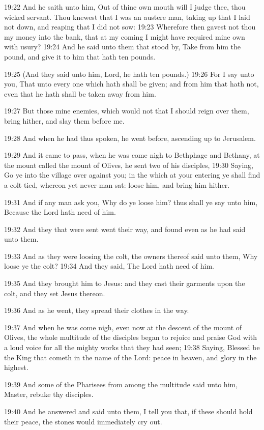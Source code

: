19:22 And he saith unto him, Out of thine own mouth will I judge thee,
thou wicked servant. Thou knewest that I was an austere man, taking up
that I laid not down, and reaping that I did not sow: 19:23 Wherefore
then gavest not thou my money into the bank, that at my coming I might
have required mine own with usury?  19:24 And he said unto them that
stood by, Take from him the pound, and give it to him that hath ten
pounds.

19:25 (And they said unto him, Lord, he hath ten pounds.)  19:26 For I
say unto you, That unto every one which hath shall be given; and from
him that hath not, even that he hath shall be taken away from him.

19:27 But those mine enemies, which would not that I should reign over
them, bring hither, and slay them before me.

19:28 And when he had thus spoken, he went before, ascending up to
Jerusalem.

19:29 And it came to pass, when he was come nigh to Bethphage and
Bethany, at the mount called the mount of Olives, he sent two of his
disciples, 19:30 Saying, Go ye into the village over against you; in
the which at your entering ye shall find a colt tied, whereon yet
never man sat: loose him, and bring him hither.

19:31 And if any man ask you, Why do ye loose him? thus shall ye say
unto him, Because the Lord hath need of him.

19:32 And they that were sent went their way, and found even as he had
said unto them.

19:33 And as they were loosing the colt, the owners thereof said unto
them, Why loose ye the colt?  19:34 And they said, The Lord hath need
of him.

19:35 And they brought him to Jesus: and they cast their garments upon
the colt, and they set Jesus thereon.

19:36 And as he went, they spread their clothes in the way.

19:37 And when he was come nigh, even now at the descent of the mount
of Olives, the whole multitude of the disciples began to rejoice and
praise God with a loud voice for all the mighty works that they had
seen; 19:38 Saying, Blessed be the King that cometh in the name of the
Lord: peace in heaven, and glory in the highest.

19:39 And some of the Pharisees from among the multitude said unto
him, Master, rebuke thy disciples.

19:40 And he answered and said unto them, I tell you that, if these
should hold their peace, the stones would immediately cry out.

